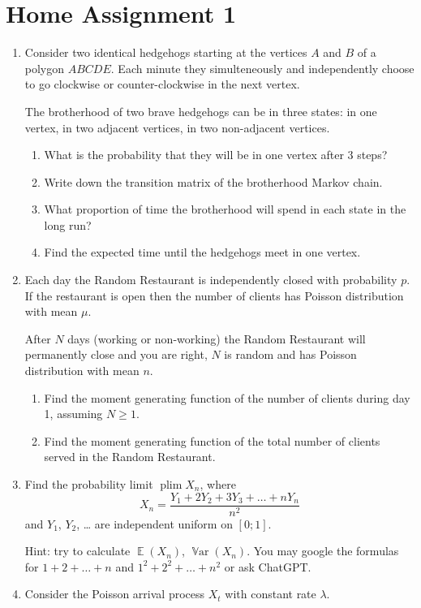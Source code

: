 \documentclass[12pt]{article}
\DeclareMathOperator{\Var}{\mathbb{V}ar}
\DeclareMathOperator{\plim}{\mathrm{plim}}
\DeclareMathOperator{\E}{\mathbb{E}}
\begin{document}
\section*{Home Assignment 1}

\begin{enumerate}
  \item Consider two identical hedgehogs starting at the vertices $A$ and $B$ of a polygon $ABCDE$. 
  Each minute they simulteneously and independently choose to go clockwise or counter-clockwise 
  in the next vertex. 

  The brotherhood of two brave hedgehogs can be in three states: in one vertex, 
  in two adjacent vertices, in two non-adjacent vertices. 

  \begin{enumerate}
    \item What is the probability that they will be in one vertex after 3 steps?
    \item Write down the transition matrix of the brotherhood Markov chain. 
    \item What proportion of time the brotherhood will spend in each state in the long run?
    \item Find the expected time until the hedgehogs meet in one vertex.
  \end{enumerate}
  \item Each day the Random Restaurant is independently closed with probability $p$.
  If the restaurant is open then the number of clients has Poisson distribution with mean $\mu$. 

  After $N$ days (working or non-working) the Random Restaurant will permanently close and you are right, 
  $N$ is random and has Poisson distribution with mean $n$. 


  \begin{enumerate}
    \item Find the moment generating function of the number of clients during day 1, 
    assuming $N \geq 1$. 
    \item Find the moment generating function of the total number of clients served in 
    the Random Restaurant. 
  \end{enumerate}
  
  
  \item Find the probability limit $\plim X_n$, where 
  \[
  X_n = \frac{Y_1 + 2Y_2 + 3Y_3 + \ldots + nY_n}{n^2}
  \]
  and $Y_1$, $Y_2$, \ldots{ } are independent uniform on $[0;1]$. 

  Hint: try to calculate $\E(X_n)$, $\Var(X_n)$.
  You may google the formulas for $1 + 2 + \ldots + n$ and $1^2 + 2^2 + \ldots + n^2$ or ask ChatGPT.
  \item Consider the Poisson arrival process $X_t$ with constant rate $\lambda$. 


\end{enumerate}
\end{document}
